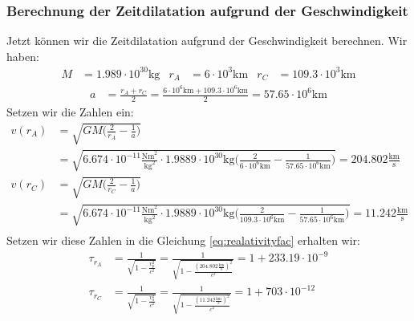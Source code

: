 \begin{refsection}
\subsubsection{Berechnung der Zeitdilatation aufgrund der Geschwindigkeit}
Jetzt können wir die Zeitdilatation aufgrund der Geschwindigkeit berechnen. Wir haben:
\begin{align*}
M &= 1.989 \cdot 10^30\text{kg} & r_A & = 6\cdot 10^3\text{km} & r_C &= 109.3\cdot 10^3\text{km}
\end{align*}
\begin{align*}
a &= \frac{r_A + r_C}{2} = \frac{6\cdot 10^6\text{km} + 109.3\cdot 10^6\text{km}}{2} = 57.65\cdot 10^6 \text{km}
\end{align*}
Setzen wir die Zahlen ein:
\begin{align*}
v(r_A) & = \sqrt{GM \biggl(\frac{2}{r_A} - \frac{1}{a}\biggr)} 
\\
& = \sqrt{6.674 \cdot 10^{-11}\frac{\text{Nm}^2}{\text{kg}^2} \cdot 1.9889 \cdot 10^{30}\text{kg} \biggl(\frac{2}{6\cdot 10^6\text{km}} - \frac{1}{57.65\cdot 10^6 \text{km}}\biggr)} = 204.802 \frac{\text{km}}{\text{s}}
\\
v(r_C) & = \sqrt{GM \biggl(\frac{2}{r_C} - \frac{1}{a}\biggr)} \\
& = \sqrt{6.674 \cdot 10^{-11}\frac{\text{Nm}^2}{\text{kg}^2} \cdot 1.9889 \cdot 10^{30}\text{kg} \biggl(\frac{2}{109.3\cdot 10^6\text{km}} - \frac{1}{57.65\cdot 10^6 \text{km}}\biggr)} = 11.242 \frac{\text{km}}{\text{s}}
\\
\end{align*}
Setzen wir diese Zahlen in die Gleichung \eqref{eq:realativityfac} erhalten wir:
\begin{align*}
\tau_{r_A} & = \frac{1}{\sqrt{\displaystyle 1 - \frac{v_{p}^2}{c^2}}} = \frac{1}{\sqrt{\displaystyle 1 - \frac{(204.802 \frac{\text{km}}{\text{s}})^2}{c^2}}} = 1 + 233.19 \cdot 10^{-9}
\\
\tau_{r_C} & = \frac{1}{\sqrt{\displaystyle 1 - \frac{v_{a}^2}{c^2}}} = \frac{1}{\sqrt{\displaystyle 1 - \frac{(11.242 \frac{\text{km}}{\text{s}})^2}{c^2}}} = 1 + 703 \cdot 10^{-12}
\end{align*}


\end{refsection}
